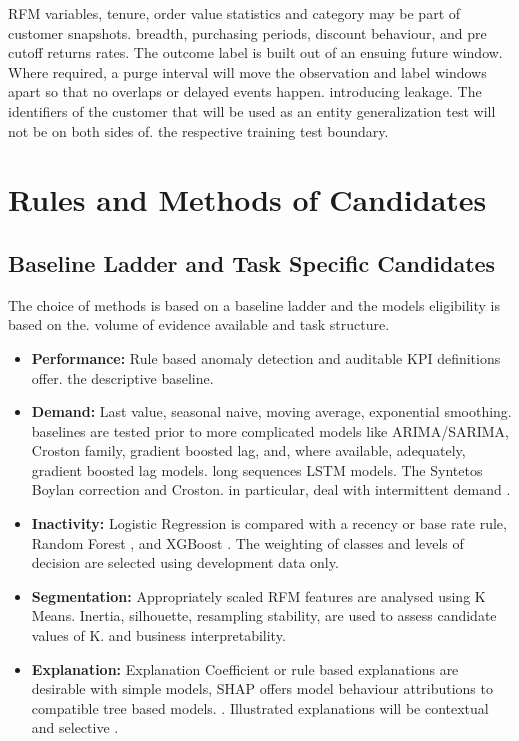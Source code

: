 \documentclass[a4paper,11pt,oneside]{book}
\theoremstyle{plain}
\theoremstyle{definition}
\theoremstyle{remark}
\begin{document}
RFM variables, tenure, order value statistics and category may be part of customer snapshots. breadth, purchasing periods, discount behaviour, and pre cutoff returns rates. The outcome label is built out of an ensuing future window. Where required, a purge interval will move the observation and label windows apart so that no overlaps or delayed events happen. introducing leakage. The identifiers of the customer that will be used as an entity generalization test will not be on both sides of. the respective training test boundary.

\section{Rules and Methods of Candidates}
\label{sec:candidate_methods}

\subsection{Baseline Ladder and Task Specific Candidates}

The choice of methods is based on a baseline ladder and the models eligibility is based on the. volume of evidence available and task structure.

\begin{itemize}
    \item \textbf{Performance:} Rule based anomaly detection and auditable KPI definitions offer. the descriptive baseline.
    \item \textbf{Demand:} Last value, seasonal naive, moving average, exponential smoothing. baselines are tested prior to more complicated models like ARIMA/SARIMA, Croston family, gradient boosted lag, and, where available, adequately, gradient boosted lag models. long sequences LSTM models. The Syntetos Boylan correction and Croston. in particular, deal with intermittent demand \cite{croston1972intermittent,syntetos2005intermittent}.
    \item \textbf{Inactivity:} Logistic Regression is compared with a recency or base rate rule, Random Forest \cite{breiman2001rf}, and XGBoost \cite{chen2016xgboost}. The weighting of classes and levels of decision are selected using development data only.
    \item \textbf{Segmentation:} Appropriately scaled RFM features are analysed using K Means. Inertia, silhouette, resampling stability, are used to assess candidate values of K. and business interpretability.
    \item \textbf{Explanation:} Explanation Coefficient or rule based explanations are desirable with simple models, SHAP offers model behaviour attributions to compatible tree based models. \cite{lundberg2017shap}. Illustrated explanations will be contextual and selective \cite{miller2019explanation}.
\end{itemize}
\end{document}
